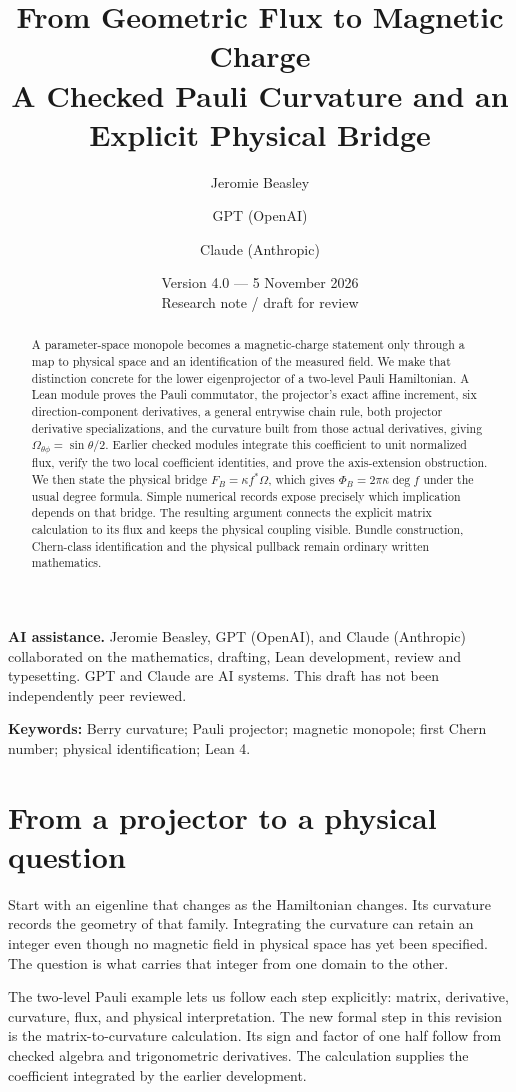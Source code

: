 \documentclass[11pt]{article}
\title{\vspace{-1.5em}From Geometric Flux to Magnetic Charge\\[0.4em]\large A Checked Pauli Curvature and an Explicit Physical Bridge}
\author{Jeromie Beasley \and GPT (OpenAI) \and Claude (Anthropic)}
\date{Version 4.0 --- 5 November 2026\\\small Research note / draft for review}
\theoremstyle{definition}\newtheorem{definition}[theorem]{Definition}
\theoremstyle{remark}\newtheorem{remark}[theorem]{Remark}
\begin{document}
\maketitle
{\small\noindent\textbf{AI assistance.} Jeromie Beasley, GPT (OpenAI), and Claude (Anthropic) collaborated on the mathematics, drafting, Lean development, review and typesetting. GPT and Claude are AI systems. This draft has not been independently peer reviewed.\par}
\begin{abstract}
A parameter-space monopole becomes a magnetic-charge statement only through a map to physical space and an identification of the measured field. We make that distinction concrete for the lower eigenprojector of a two-level Pauli Hamiltonian. A Lean module proves the Pauli commutator, the projector's exact affine increment, six direction-component derivatives, a general entrywise chain rule, both projector derivative specializations, and the curvature built from those actual derivatives, giving $\Omega_{\theta\phi}=\sin\theta/2$. Earlier checked modules integrate this coefficient to unit normalized flux, verify the two local coefficient identities, and prove the axis-extension obstruction. We then state the physical bridge $F_B=\kappa f^*\Omega$, which gives $\Phi_B=2\pi\kappa\deg f$ under the usual degree formula. Simple numerical records expose precisely which implication depends on that bridge. The resulting argument connects the explicit matrix calculation to its flux and keeps the physical coupling visible. Bundle construction, Chern-class identification and the physical pullback remain ordinary written mathematics.

\end{abstract}
\noindent\textbf{Keywords:} Berry curvature; Pauli projector; magnetic monopole; first Chern number; physical identification; Lean 4.

\section{From a projector to a physical question}
Start with an eigenline that changes as the Hamiltonian changes. Its curvature records the geometry of that family. Integrating the curvature can retain an integer even though no magnetic field in physical space has yet been specified. The question is what carries that integer from one domain to the other.

The two-level Pauli example lets us follow each step explicitly: matrix, derivative, curvature, flux, and physical interpretation. The new formal step in this revision is the matrix-to-curvature calculation. Its sign and factor of one half follow from checked algebra and trigonometric derivatives. The calculation supplies the coefficient integrated by the earlier development.
\end{document}
